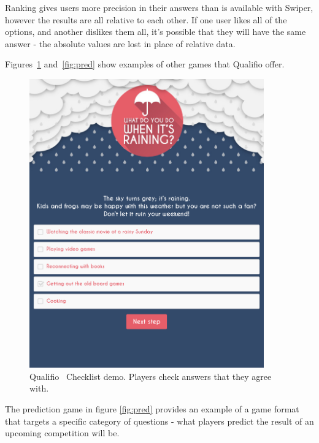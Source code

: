 Ranking gives users more precision in their answers than is available with Swiper, however the results are all relative to each other. If one user likes all of the options, and another dislikes them all, it's possible that they will have the same answer - the absolute values are lost in place of relative data.

Figures~\ref{fig:check} and~\ref{fig:pred} show examples of other games that Qualifio offer.

\begin{figure}[!h]
	\centering
	\includegraphics[width=0.9\textwidth]{./images/context/check.png}
	\caption{Qualifio~\cite{Qualifio} Checklist demo. Players check answers that they agree with.}
	\label{fig:check}
\end{figure}

The prediction game in figure \ref{fig:pred} provides an example of a game format that targets a specific category of questions - what players predict the result of an upcoming competition will be.

